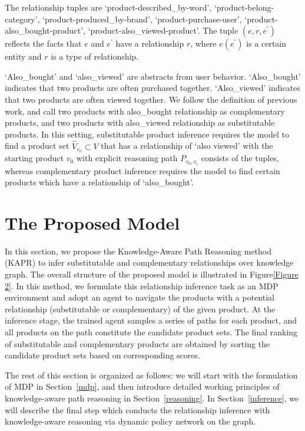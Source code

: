 \documentclass[review]{elsarticle}
\begin{document}
\begin{sloppypar}
The relationship tuples are `product-described\_by-word', `product-belong-category', `product-produced\_by-brand', `product-purchase-user', `product-also\_bought-product', `product-also\_viewed-product'.
The tuple $(e,r,e^{'})$ reflects the facts that $e$ and $e^{'}$ have a relationship $r$, where $e(e^{'})$ is a certain entity and $r$ is a type of relationship. 

`Also\_bought’ and ‘also\_viewed’ are abstracts from user behavior. `Also\_bought’ indicates that two products are often purchased together. `Also\_viewed’ indicates that two products are often viewed together. We follow the definition of previous work, and call two products with also\_bought relationship as complementary products, and two products with also\_viewed relationship as substitutable products.
In this setting, substitutable product inference requires the model to find a product set $\hat{V}_{v_{o}} \subset V$ that has a relationship of ‘also viewed’ with the starting product $v_{0}$ with explicit reasoning path $P_{v_{0},v_{i}}$ consists of the tuples, whereas complementary product inference requires the model to find certain products which have a relationship of ‘also\_bought’.
\section{The Proposed Model}
In this section, we propose the Knowledge-Aware Path Reasoning method (KAPR) to infer substitutable and complementary relationships over knowledge graph. The overall structure of the proposed model is illustrated in Figure\ref{Figure 2}. In this method, we formulate this relationship inference task as an MDP environment and adopt an agent to navigate the products with a potential relationship (substitutable or complementary) of the given product. 
At the inference stage, the trained agent samples a series of paths for each product, and all  products on the path constitute the candidate product sets. The final ranking of substitutable and complementary products are obtained by sorting the candidate product sets based on corresponding scores. 

The rest of this section is organized as follows: we will start with the formulation of MDP in Section~\ref{mdp}, and then introduce detailed working principles of knowledge-aware path reasoning in Section~\ref{reasoning}. In Section~\ref{inference}, we will describe the final step which conducts  the relationship inference with knowledge-aware  reasoning via dynamic policy network on the graph.


\end{sloppypar}
\end{document}
